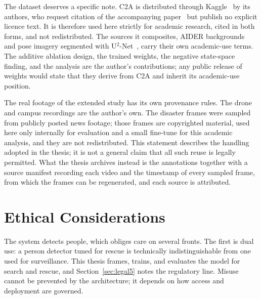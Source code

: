 \documentclass[12pt,a4paper,oneside]{report}
\begin{document}
The dataset deserves a specific note. C2A is distributed through
Kaggle~\cite{c2akaggle} by its authors, who request citation of the
accompanying paper~\cite{nihal2024c2a} but publish no explicit licence text.
It is therefore used here strictly for academic research, cited in both
forms, and not redistributed. The sources it composites, AIDER
backgrounds~\cite{kyrkou2020aider} and pose imagery segmented with
U$^2$-Net~\cite{qin2020u2net}, carry their own academic-use terms. The
additive ablation design, the trained weights, the negative state-space
finding, and the analysis are the author's contributions; any public release
of weights would state that they derive from C2A and inherit its
academic-use position.

The real footage of the extended study has its own provenance rules. The
drone and campus recordings are the author's own. The disaster frames were
sampled from publicly posted news footage; those frames are copyrighted
material, used here only internally for evaluation and a small fine-tune
for this academic analysis, and they are not redistributed. This statement
describes the handling adopted in the thesis; it is not a general claim that
all such reuse is legally permitted. What the
thesis archives instead is the annotations together with a source manifest
recording each video and the timestamp of every sampled frame, from which
the frames can be regenerated, and each source is attributed.

\section{Ethical Considerations}
The system detects people, which obliges care on several fronts. The first is
dual use: a person detector tuned for rescue is technically indistinguishable
from one used for surveillance. This thesis frames, trains, and evaluates the
model for search and rescue, and Section~\ref{sec:legal5} notes the
regulatory line. Misuse cannot be prevented by the architecture; it depends on
how access and deployment are governed.
\end{document}
